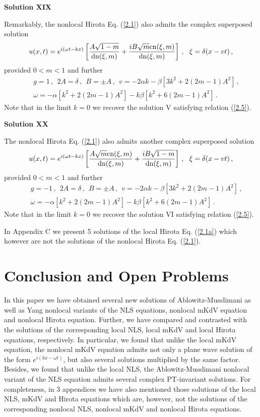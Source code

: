 \documentclass[11pt]{article}
\newcommand{\be}{\begin{equation}}
\newcommand{\ee}{\end{equation}}
\newcommand{\bea}{\begin{eqnarray}}
\newcommand{\eea}{\end{eqnarray}}
\newcommand{\dn}{{\rm dn}}
\newcommand{\cn}{{\rm cn}}
\begin{document}
{\bf Solution XIX}

Remarkably, the nonlocal Hirota Eq. (\ref{2.1}) also admits the
complex superposed solution
\be\label{8.22}
u(x,t) = e^{i(\omega t - kx)} \left[\frac{A\sqrt{1-m}}{\dn(\xi,m)}
+ \frac{iB\sqrt{m}\cn(\xi,m)}{\dn(\xi,m)}\right]\,,~~\xi = \delta(x-vt)\,,
\ee
provided $0 < m < 1$ and further
\bea\label{8.23}
&&g = 1\,,~~2A = \delta\,,~~B = \pm A\,,~~v = -2\alpha k 
-\beta[3k^2+2(2m-1)A^2]\,, \nonumber \\
&&\omega = -\alpha[k^2+2(2m-1)A^2] -k\beta[k^2+6(2m-1)A^2] \,.
\eea
Note that in the limit $k = 0$ we recover the solution V 
satisfying relation (\ref{2.5}). 

{\bf Solution XX}

The nonlocal Hirota Eq. (\ref{2.1}) also admits another
complex superposed solution
\be\label{8.24}
u(x,t) = e^{i(\omega t - kx)} \left[\frac{A\sqrt{m}\cn(\xi,m)}{\dn(\xi,m)}
+ \frac{iB\sqrt{1-m}}{\dn(\xi,m)}\right]\,,~~\xi = \delta(x-vt)\,,
\ee
provided $0 < m < 1$ and further
\bea\label{8.25}
&&g = -1\,,~~2A = \delta\,,~~B = \pm A\,,~~v = -2\alpha k 
-\beta[3k^2+2(2m-1)A^2]\,, \nonumber \\
&&\omega = -\alpha[k^2+2(2m-1)A^2] -k\beta[k^2+6(2m-1)A^2] \,.
\eea
Note that in the limit $k = 0$ we recover the solution VI
satisfying relation (\ref{2.5}). 

In Appendix C we present 5 solutions of the local Hirota Eq. (\ref{2.1a})
which however are not the solutions of the nonlocal Hirota Eq. (\ref{2.1}). 

\section{Conclusion and Open Problems}

In this paper we have obtained several new solutions of 
Ablowitz-Musslimani as well as Yang nonlocal variants of the NLS equations, 
nonlocal mKdV equation and nonlocal Hirota equation. Further, we have 
compared and contrasted with the solutions of the corresponding local NLS,
local mKdV and local Hirota equations, respectively. In particular, we found
that unlike the local mKdV equation, the nonlocal mKdV equation admits
not only a plane wave solution of the form $e^{i(kx-\omega t)}$, but also 
several solutions multiplied by the same factor. Besides, we found that
unlike the local NLS, the Ablowitz-Musslimani nonlocal variant of the NLS 
equation admits several complex PT-invariant solutions. For completeness,
in 3 appendices we have also mentioned those solutions of the local NLS, 
mKdV and Hirota equations which are, however, not the solutions of the 
corresponding nonlocal NLS, nonlocal mKdV and nonlocal Hirota equations.
\end{document}
